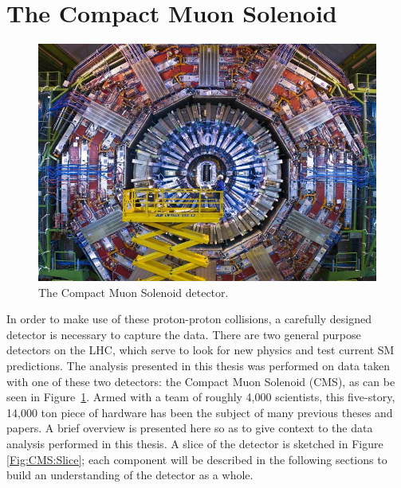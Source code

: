 \vspace{5mm}
\section{The Compact Muon Solenoid}

\begin{figure}[h!]
    \centering
        \includegraphics[width=\textwidth]{F3/cms_0}
        \caption{The Compact Muon Solenoid detector.}
        \label{Fig:CMS:cms}
\end{figure}
In order to make use of these proton-proton collisions, a carefully designed detector is necessary to capture the data. There are two general purpose detectors on the LHC, which serve to look for new physics and test current SM predictions. The analysis presented in this thesis was performed on data taken with one of these two detectors: the Compact Muon Solenoid (CMS)\cite{Bayatian:922757}, as can be seen in Figure~\ref{Fig:CMS:cms}. Armed with a team of roughly 4,000 scientists, this five-story, 14,000 ton piece of hardware has been the subject of many previous theses and papers. A brief overview is presented here so as to give context to the data analysis performed in this thesis. A slice of the detector is sketched in Figure \ref{Fig:CMS:Slice}; each component will be described in the following sections to build an understanding of the detector as a whole.
